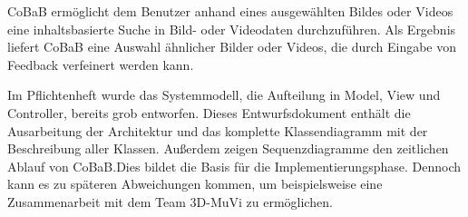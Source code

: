 CoBaB ermöglicht dem Benutzer anhand eines ausgewählten Bildes oder Videos eine inhaltsbasierte Suche in Bild- oder Videodaten durchzuführen. Als Ergebnis liefert CoBaB eine Auswahl ähnlicher Bilder oder Videos, die durch Eingabe von Feedback verfeinert werden kann.\newline

Im Pflichtenheft wurde das Systemmodell, die Aufteilung in Model, View und Controller, bereits grob entworfen.
Dieses Entwurfsdokument enthält die Ausarbeitung der Architektur und das komplette Klassendiagramm mit der Beschreibung aller Klassen. Außerdem zeigen Sequenzdiagramme den zeitlichen Ablauf von CoBaB.\newline Dies bildet die Basis für die Implementierungsphase. Dennoch kann es zu späteren Abweichungen kommen, um beispielsweise eine Zusammenarbeit mit dem Team 3D-MuVi zu ermöglichen.